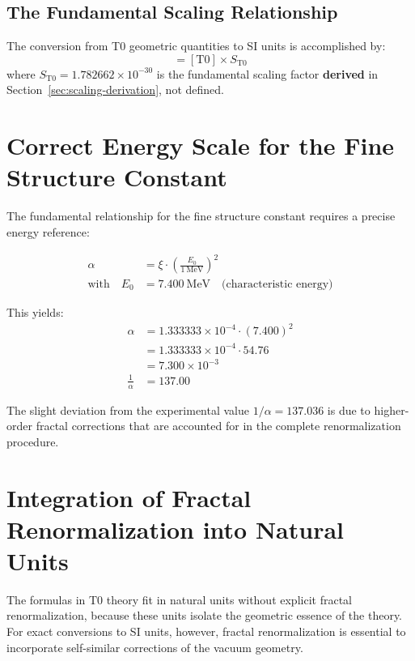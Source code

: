 \documentclass[12pt,a4paper]{article}
\begin{document}
	\subsection{The Fundamental Scaling Relationship}
	The conversion from T0 geometric quantities to SI units is accomplished by:
	\begin{equation}
		[\mathrm{SI}] = [\mathrm{T0}] \times S_{\text{T0}}
	\end{equation}
	where $S_{\text{T0}} = 1.782662 \times 10^{-30}$ is the fundamental scaling factor \textbf{derived} in Section~\ref{sec:scaling-derivation}, not defined.
	
	\section{Correct Energy Scale for the Fine Structure Constant}
	
	The fundamental relationship for the fine structure constant requires a precise energy reference:
	
	\begin{align}
		\alpha &= \xi \cdot \left( \frac{E_0}{1~\mathrm{MeV}} \right)^2 \\
		\text{with} \quad E_0 &= 7.400~\mathrm{MeV} \quad \text{(characteristic energy)}
	\end{align}
	
	This yields:
	\begin{align}
		\alpha &= 1.333333 \times 10^{-4} \cdot (7.400)^2 \\
		&= 1.333333 \times 10^{-4} \cdot 54.76 \\
		&= 7.300 \times 10^{-3} \\
		\frac{1}{\alpha} &= 137.00
	\end{align}
	
	The slight deviation from the experimental value $1/\alpha = 137.036$ is due to higher-order fractal corrections that are accounted for in the complete renormalization procedure.
	
	\section{Integration of Fractal Renormalization into Natural Units}
	
	The formulas in T0 theory fit in natural units without explicit fractal renormalization, because these units isolate the geometric essence of the theory. For exact conversions to SI units, however, fractal renormalization is essential to incorporate self-similar corrections of the vacuum geometry.
	
\end{document}
